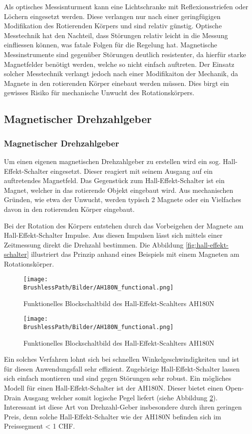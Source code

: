 \fi
Als optisches Messisnturment kann eine Lichtschranke mit 
Reflexionsstriefen oder Löchern eingesetzt werden. Diese verlangen
nur nach einer geringfügigen Modifikation des Rotierenden Körpers und
sind relativ günstig. Optische Messtechnik hat den Nachteil, dass
Störungen relativ leicht in die Messung einfliessen können, was fatale
Folgen für die Regelung hat. Magnetische Messinstrumente sind gegenüber
Störungen deutlich resistenter, da hierfür starke Magnetfelder benötigt
werden, welche so nicht einfach auftreten. Der Einsatz solcher Messtechnik
verlangt jedoch nach einer Modifikaiton der Mechanik, da Magnete in den
rotierenden Körper einebaut werden müssen. Dies birgt ein gewisses
Risiko für mechanische Unwucht des Rotationskörpers.

\ifSTANDALONE
\subsection{Magnetischer Drehzahlgeber}
\fi
\ifEMBED
\subsubsection{Magnetischer Drehzahlgeber}
\fi
Um einen eigenen magnetischen Drehzahlgeber zu erstellen wird ein
sog. Hall-Effekt-Schalter eingesetzt. Dieser reagiert mit seinem Ausgang
auf ein auftretendes Magnetfeld. Das Gegenstück zum Hall-Effekt-Schalter
ist ein Magnet, welcher in das rotierende Objekt eingebaut wird. Aus 
mechanischen Gründen, wie etwa der Unwucht, werden typisch 2 Magnete
oder ein Vielfaches davon in den rotierenden Körper eingebaut.

Bei der Rotation des Körpers entstehen durch das Vorbeigehen der Magnete
am Hall-Effekt-Schalter Impulse. Aus diesen Impulsen lässt sich mittels einer
Zeitmessung direkt die Drehzahl bestimmen. Die Abbildung 
\ref{fig:hall-effekt-schalter} illustriert das Prinzip anhand eines
Beispiels mit einem Magneten am Rotationskörper.
%
\ifSTANDALONE
\begin{figure}[h!]
	\centering
	\texttt{[image: \\BrushlessPath/Bilder/AH180N\_functional.png]}
	\caption{Funktionelles Blockschaltbild des Hall-Effekt-Scahlters AH180N}
	\label{fig:AH180N_functional}
\end{figure}
\fi
%
\ifEMBED
\begin{figure}[h!]
	\centering
	\texttt{[image: \\BrushlessPath/Bilder/AH180N\_functional.png]}
	\caption{Funktionelles Blockschaltbild des Hall-Effekt-Scahlters AH180N}
	\label{fig:AH180N_functional}
\end{figure}
\fi
%
Ein solches Verfahren lohnt sich bei schnellen Winkelgeschwindigkeiten
und ist für diesen Anwendungsfall sehr effizient. Zugehörige
Hall-Effekt-Schalter lassen sich einfach montieren und sind gegen Störungen
sehr robust. Ein mögliches Modell für einen Hall-Effekt-Schalter ist der
AH180N. Dieser bietet einen Open-Drain Ausgang welcher somit logische Pegel
liefert (siehe Abbildung \ref{fig:AH180N_functional}). Interessant ist diese
Art von Drehzahl-Geber insbesondere durch ihren geringen Preis, denn solche
Hall-Effekt-Schalter wie der AH180N befinden
sich im Preissegment < 1 CHF.

